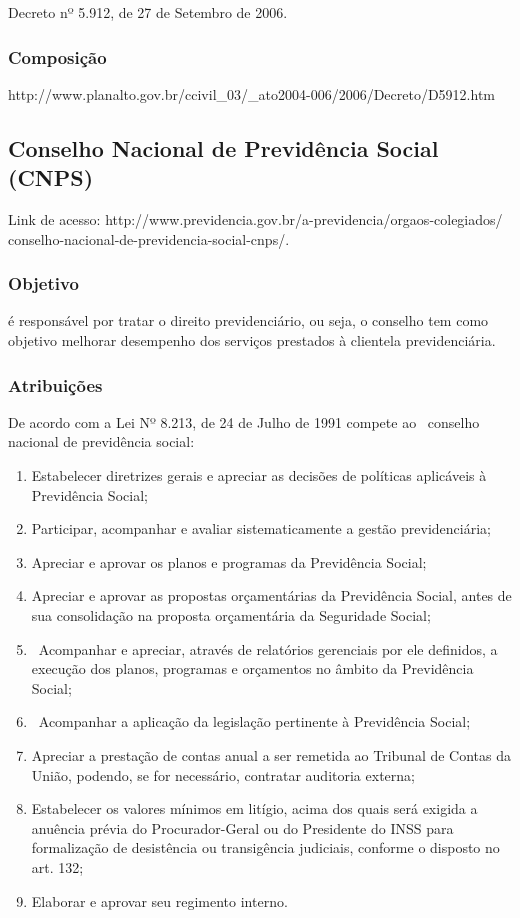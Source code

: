 Decreto nº 5.912, de 27 de Setembro de 2006.

\subsubsection*{Composição}


http://www.planalto.gov.br/ccivil\_03/\_ato2004-006/2006/Decreto/D5912.htm

\newpage
\subsection*{Conselho Nacional de Previdência Social (CNPS)}

Link de acesso:
http://www.previdencia.gov.br/a-previdencia/orgaos-colegiados/
conselho-nacional-de-previdencia-social-cnps/.


\subsubsection*{Objetivo}



é responsável por tratar o direito previdenciário, ou seja, o
conselho tem como objetivo melhorar desempenho dos serviços
prestados à clientela previdenciária.


\subsubsection*{Atribuições}


De acordo com a Lei Nº 8.213, de 24 de Julho de 1991
compete ao \ conselho nacional de previdência social:

\begin{enumerate}
\item 
Estabelecer diretrizes gerais e apreciar as decisões de políticas
aplicáveis à Previdência Social;
\item 
Participar, acompanhar e avaliar sistematicamente a gestão
previdenciária;
\item 
Apreciar e aprovar os planos e programas da Previdência Social;
\item 
Apreciar e aprovar as propostas orçamentárias da Previdência
Social, antes de sua consolidação na proposta orçamentária
da Seguridade Social;
\item 
\ Acompanhar e apreciar, através de relatórios gerenciais por ele
definidos, a execução dos planos, programas e orçamentos no
âmbito da Previdência Social;
\item 
\ Acompanhar a aplicação da legislação pertinente à
Previdência Social;
\item 
Apreciar a prestação de contas anual a ser remetida ao Tribunal de
Contas da União, podendo, se for necessário, contratar auditoria
externa;
\item 
Estabelecer os valores mínimos em litígio, acima dos quais será
exigida a anuência prévia do Procurador-Geral ou do Presidente do
INSS para formalização de desistência ou transigência
judiciais, conforme o disposto no art. 132;
\item 
Elaborar e aprovar seu regimento interno.
\end{enumerate}

